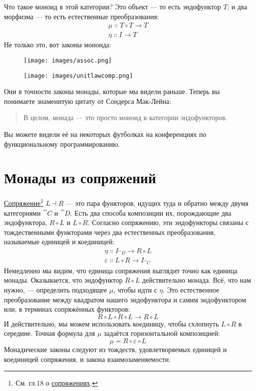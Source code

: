 Что такое моноид в этой категории? Это объект --- то есть
эндофунктор $T$; и два морфизма --- то есть естественные
преобразования:
\begin{gather*}
  \mu \Colon T \circ T \to T \\
  \eta \Colon I \to T
\end{gather*}
Не только это, вот законы моноида:

\begin{figure}[H]
  \centering
  \texttt{[image: images/assoc.png]}
\end{figure}

\begin{figure}[H]
  \centering
  \texttt{[image: images/unitlawcomp.png]}
\end{figure}

\noindent
Они в точности законы монады, которые мы видели раньше. Теперь вы понимаете
знаменитую цитату от Сондерса Мак-Лейна:

\begin{quote}
  В целом, монада --- это просто моноид в категории эндофункторов.
\end{quote}
Вы можете видели её на некоторых футболках на конференциях по функциональному
программированию.

\section{Монады из сопряжений}

\hyperref[adjunctions]{Сопряжение}\footnote{См. гл.18 о \hyperref[adjunctions]{сопряжениях}.}
$L \dashv R$ --- это пара функторов, идущих туда и обратно между двумя
категориями $\cat{C}$ и $\cat{D}$. Есть два способа композиции их,
порождающие два эндофунктора, $R \circ L$ и $L \circ R$.
Согласно сопряжению, эти эндофункторы связаны с тождественными
функторами через два естественных преобразования, называемые единицей и коединицей:
\begin{gather*}
  \eta \Colon I_{\cat{D}} \to R \circ L \\
  \varepsilon \Colon L \circ R \to I_{\cat{C}}
\end{gather*}
Немедленно мы видим, что единица сопряжения выглядит точно как
единица монады. Оказывается, что эндофунктор $R \circ L$
действительно монада. Всё, что нам нужно, --- определить подходящее $\mu$, чтобы идти с
$\eta$. Это естественное преобразование между квадратом нашего
эндофунктора и самим эндофунктором или, в терминах сопряжённых
функторов:
\[R \circ L \circ R \circ L \to R \circ L\]
И действительно, мы можем использовать коединицу, чтобы схлопнуть $L \circ R$ в
середине. Точная формула для $\mu$ задаётся горизонтальной
композицией:
\[\mu = R \circ \varepsilon \circ L\]
Монадические законы следуют из тождеств, удовлетворяемых единицей и коединицей
сопряжения, и закона взаимозаменяемости.

